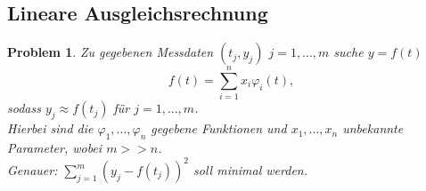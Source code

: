 \documentclass[12pt]{article}
\theoremstyle{break}
\newtheorem{comment}[theorem]{Bemerkung}
\newtheorem{problem}[theorem]{Problem}
\begin{document}

\subsection{Lineare Ausgleichsrechnung}

\begin{problem}
Zu gegebenen Messdaten $(t_j, y_j)$ $j=1,...,m$ suche $y = f(t)$
$$f(t) = \sum_{i=1}^n x_i \varphi_i(t),$$
sodass $y_j \approx f(t_j)$ für $j=1,...,m$.\\
Hierbei sind die $\varphi_1, ..., \varphi_n$ gegebene Funktionen und $x_1, ..., x_n$ unbekannte Parameter, wobei $m>>n$.\\
Genauer: $\sum_{j=1}^m (y_j - f(t_j))^2$ soll minimal werden.
\end{problem}
\end{document}
